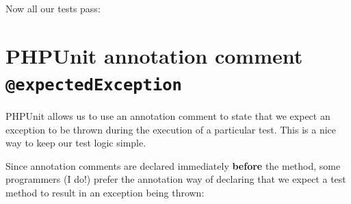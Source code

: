 \documentclass[a4paperpaper,openright]{book}
\newenvironment{Shaded}{}{}
\newcommand{\AnnotationTok}[1]{\textcolor[rgb]{0.38,0.63,0.69}{\textbf{\textit{#1}}}}
\newcommand{\CommentTok}[1]{\textcolor[rgb]{0.38,0.63,0.69}{\textit{#1}}}
\newcommand{\DecValTok}[1]{\textcolor[rgb]{0.25,0.63,0.44}{#1}}
\newcommand{\ExtensionTok}[1]{#1}
\newcommand{\KeywordTok}[1]{\textcolor[rgb]{0.00,0.44,0.13}{\textbf{#1}}}
\newcommand{\NormalTok}[1]{#1}
\newcommand{\OtherTok}[1]{\textcolor[rgb]{0.00,0.44,0.13}{#1}}
\newcommand{\StringTok}[1]{\textcolor[rgb]{0.25,0.44,0.63}{#1}}
\begin{document}
Now all our tests pass:

\begin{Shaded}
\end{Shaded}

\hypertarget{phpunit-annotation-comment-expectedexception}{%
\section{\texorpdfstring{PHPUnit annotation comment
\texttt{@expectedException}}{PHPUnit annotation comment @expectedException}}\label{phpunit-annotation-comment-expectedexception}}

PHPUnit allows us to use an annotation comment to state that we expect
an exception to be thrown during the execution of a particular test.
This is a nice way to keep our test logic simple.

Since annotation comments are declared immediately \textbf{before} the
method, some programmers (I do!) prefer the annotation way of declaring
that we expect a test method to result in an exception being thrown:

\begin{Shaded}
\end{Shaded}
\end{document}
